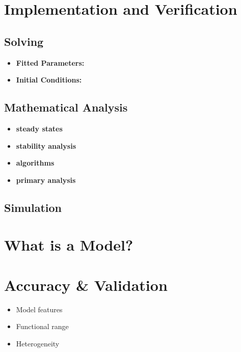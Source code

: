\documentclass[
]{book}
\begin{document}
\section{Implementation and Verification}\label{implementation-and-verification}

\subsection{Solving}\label{solving-1}

\begin{itemize}
\item
  \textbf{Fitted Parameters:}
\item
  \textbf{Initial Conditions:}
\end{itemize}

\subsection{Mathematical Analysis}\label{mathematical-analysis}

\begin{itemize}
\item
  \textbf{steady states}
\item
  \textbf{stability analysis}
\item
  \textbf{algorithms}
\item
  \textbf{primary analysis}
\end{itemize}

\subsection{Simulation}\label{simulation-1}

\section{What is a Model?}\label{what-is-a-model-1}

\section{Accuracy \& Validation}\label{accuracy-validation}

\begin{itemize}
\item
  Model features
\item
  Functional range
\item
  Heterogeneity
\end{itemize}
\end{document}
